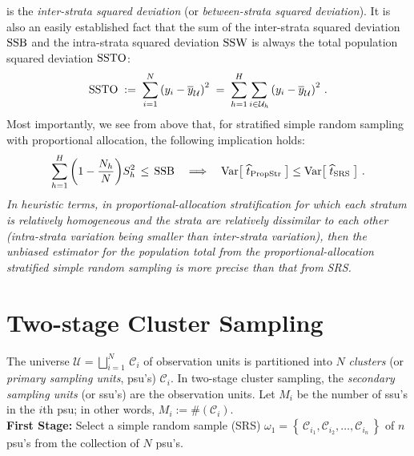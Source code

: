 \documentclass{article}
\begin{document}
is the \emph{inter-strata squared deviation} (or \emph{between-strata squared deviation}).  It is also an easily established fact that the sum of the inter-strata squared deviation $\textnormal{SSB}$ and the intra-strata squared deviation $\textnormal{SSW}$ is always the total population squared deviation $\textnormal{SSTO}$:
\begin{equation*}
   \textnormal{SSTO} \; := \; \sum^{N}_{i=1}\left(y_{i}-\overline{y}_{\mathcal{U}}\right)^{2}
   \; = \; \sum^{H}_{h=1}\sum_{i\in\mathcal{U}_{h}}\left(y_{i}-\overline{y}_{\mathcal{U}}\right)^{2}\,.
\end{equation*}
Most importantly, we see from above that, for stratified simple random sampling with proportional allocation, the following implication holds:
\begin{equation*}
\sum_{h=1}^{H}\left(1-\dfrac{N_{h}}{N}\right)\!S^{2}_{h} \,\leq\, \textnormal{SSB}
\quad\Longrightarrow\quad
\textnormal{Var}\!\left[\;\widehat{t}_{\textnormal{PropStr}}\;\right]
\leq
\textnormal{Var}\!\left[\;\widehat{t}_{\textnormal{SRS}}\;\right]\,.
\end{equation*}
\emph{In heuristic terms, in proportional-allocation stratification for which each stratum is relatively homogeneous and the strata are relatively dissimilar to each other (intra-strata variation being smaller than inter-strata variation), then the unbiased estimator for the population total from the proportional-allocation stratified simple random sampling is more precise than that from SRS.
}



\section{Two-stage Cluster Sampling}
\setcounter{theorem}{0}

The universe $\mathcal{U} = \displaystyle{\bigsqcup_{i=1}^{N}}\,\mathcal{C}_{i}$ of observation units is partitioned into $N$ \emph{clusters} (or \emph{primary sampling units}, psu's) $\mathcal{C}_{i}$.  In two-stage cluster sampling, the \emph{secondary sampling units} (or ssu's) are the observation units.  Let $M_{i}$ be the number of ssu's in the $i$th psu; in other words, $M_{i} := \#(\mathcal{C}_{i})$. \\

\noindent
\textbf{First Stage:} \; Select a simple random sample (SRS) $\omega_{1} = \left\{\,\mathcal{C}_{i_{1}},\mathcal{C}_{i_{2}},\ldots,\mathcal{C}_{i_{n}}\,\right\}$ of $n$ psu's from the collection of $N$ psu's. \\
\end{document}
